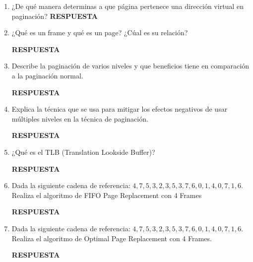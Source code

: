 \documentclass[12pt]{article}
\begin{document}
\begin{enumerate}
    \item ¿De qué manera determinas a que página pertenece una dirección virtual en paginación?
    \vspace{0mm}
    \textbf{RESPUESTA}

    \item ¿Qué es un frame y qué es un page? ¿Cúal es su relación?
    \vspace{2mm}
    
    \textbf{RESPUESTA}

    \item Describe la paginación de varios niveles y que beneficios tiene en comparación a la paginación normal.
    \vspace{2mm}
    
    \textbf{RESPUESTA}

    \item Explica la técnica que se usa para mitigar los efectos negativos de usar múltiples niveles en la técnica de paginación.
    \vspace{2mm}
    
    \textbf{RESPUESTA}

    \item ¿Qué es el TLB (Translation Lookside Buffer)?
    \vspace{2mm}
    
    \textbf{RESPUESTA}

    \item Dada la siguiente cadena de referencia: $4,7,5,3,2,3,5,3,7,6,0,1,4,0,7,1,6.$ Realiza el algoritmo de FIFO Page Replacement con 4 Frames
    \vspace{2mm}
    
    \textbf{RESPUESTA}

    \item Dada la siguiente cadena de referencia: $4,7,5,3,2,3,5,3,7,6,0,1,4,0,7,1,6.$ Realiza el algoritmo de Optimal Page Replacement con 4 Frames.
    \vspace{2mm}
    
    \textbf{RESPUESTA}

\end{enumerate}
\end{document}
